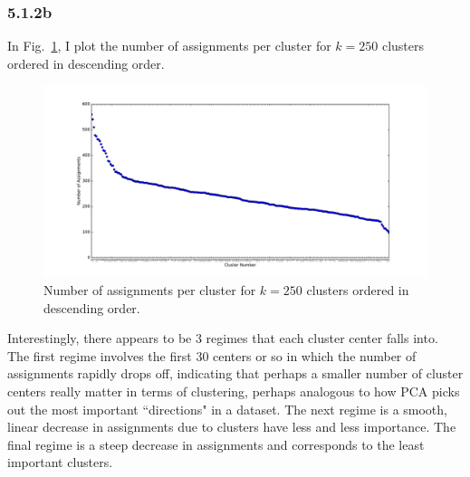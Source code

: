 \documentclass[12pt]{amsart}
\begin{document}
\subsubsection*{5.1.2b}
In Fig.~\ref{fig:k_250_num_assignments}, I plot the number of assignments per cluster for $k = 250$ clusters ordered in descending order.
\begin{figure}[H]
	\includegraphics[width=\columnwidth]{k_250_num_assignments.pdf}
    \caption{Number of assignments per cluster for $k = 250$ clusters ordered in descending order.}
    \label{fig:k_250_num_assignments}
\end{figure}
Interestingly, there appears to be 3 regimes that each cluster center falls into.  The first regime involves the first 30 centers or so in which the number of assignments rapidly drops off, indicating that perhaps a smaller number of cluster centers really matter in terms of clustering, perhaps analogous to how PCA picks out the most important ``directions" in a dataset.  The next regime is a smooth, linear decrease in assignments due to clusters have less and less importance.  The final regime is a steep decrease in assignments and corresponds to the least important clusters.
\end{document}
